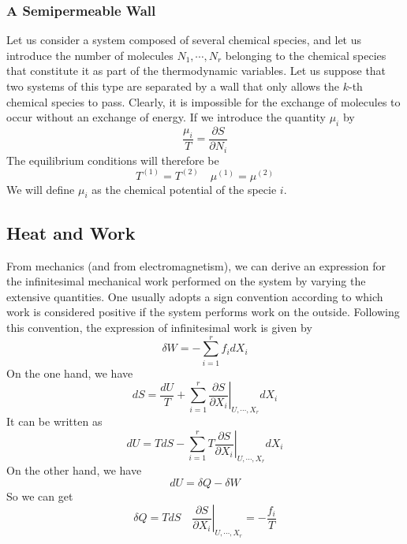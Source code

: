 \documentclass[cyan]{elegantnote}
\begin{document}
\subsubsection{A Semipermeable Wall}
Let us consider a system composed of several chemical species, and let us introduce the number of molecules $N_1, \cdots, N_{r}$ belonging to the chemical species that constitute it as part of the thermodynamic variables. Let us suppose that two systems of this type are separated by a wall that only allows the $k$-th chemical species to pass. Clearly, it is impossible for the exchange of molecules to occur without an exchange of energy. If we introduce the quantity $\mu_i$ by
\[\frac{\mu_i}{T} =  \frac{\partial S}{\partial N_i} \]
The equilibrium conditions will therefore be
\[T^{(1)} = T^{(2)} \quad \mu^{(1)} = \mu^{(2)}\]
We will define $\mu_i$ as the chemical potential of the specie $i$.

\subsection{Heat and Work}
From mechanics (and from electromagnetism), we can derive an expression for the infinitesimal mechanical work performed on the system by varying the extensive quantities. One usually adopts a sign convention according to which work is considered positive if the system performs work on the outside. Following this convention, the expression of infinitesimal work is given by
\[\delta W  =  -\sum_{i = 1}^{r} f_i dX_i\]
On the one hand, we have
\[dS = \frac{dU}{T} + \sum_{i = 1}^{r} \left. \frac{\partial S}{\partial X_i} \right|_{U,\cdots,X_r} dX_i\]
It can be written as
\[dU = TdS - \sum_{i = 1}^{r} \left. T \frac{\partial S}{\partial X_i} \right|_{U,\cdots,X_r} dX_i\]
On the other hand, we have
\[dU = \delta Q - \delta W\]
So we can get
\[\delta Q = TdS \quad \left. \frac{\partial S}{\partial X_i} \right|_{U,\cdots,X_r} = - \frac{f_i}{T}\]
\end{document}
